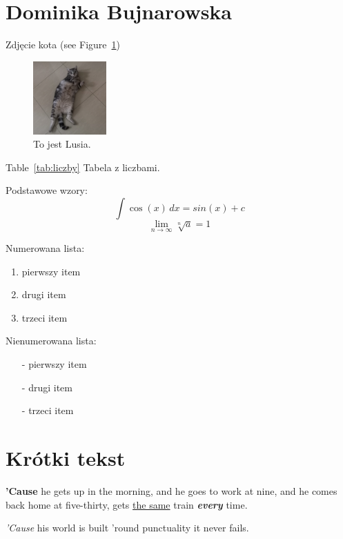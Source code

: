 \section{Dominika Bujnarowska}
\label{sec:dominika}

Zdjęcie kota (see Figure~\ref{fig:cat})

\begin{figure}[htbp]
    \centering
    \includegraphics[width=0.25\textwidth]{pictures/dominika.jpg}
    \caption{To jest Lusia.}
    \label{fig:cat}
\end{figure}

Table~\ref{tab:liczby} Tabela z liczbami.


Podstawowe wzory:
\[\int\cos(x)\,dx=sin(x)+c\]
\[\lim_{n\to\infty} \sqrt[n]{a} = 1\]

Numerowana lista:
\begin{enumerate}
    \item pierwszy item
    \item drugi item
    \item trzeci item
\end{enumerate}

Nienumerowana lista:
\begin{itemize}
    \item [-] pierwszy item
    \item [-] drugi item
    \item [-] trzeci item
\end{itemize}


\section*{Krótki tekst}
\textbf{'Cause} he gets up in the morning, and he goes to work at nine, and he comes back home at five-thirty, gets \underline{the same} train \textbf{\textit{every}} time. \par
\vspace{0.1cm}
\emph{'Cause} his world is built 'round punctuality it never fails.
